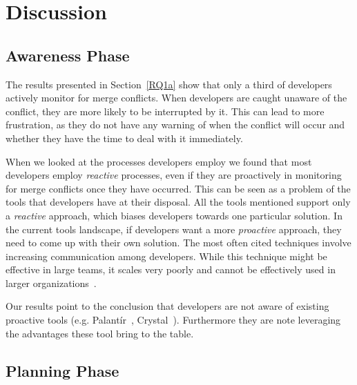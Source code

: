 
\section{Discussion}\label{discussion}

\subsection{Awareness Phase}

The results presented in Section~\ref{RQ1a} show that only a third of developers actively monitor for merge conflicts.
When developers are caught unaware of the conflict, they are more likely to be interrupted by it.
This can lead to more frustration, as they do not have any warning of when the conflict will occur and whether they have the time to deal with it immediately.

When we looked at the processes developers employ we found that most developers employ \emph{reactive} processes, even if they are proactively in monitoring for merge conflicts once they have occurred.
This can be seen as a problem of the tools that developers have at their disposal.
All the tools mentioned support only a \emph{reactive} approach, which biases developers towards one particular solution.
In the current tools landscape, if developers want a more \emph{proactive} approach, they need to come up with their own solution.
The most often cited techniques involve increasing communication among developers.
While this technique might be effective in large teams, it scales very poorly and cannot be effectively used in larger organizations~\cite{brooks1974mythical}\cite{steiner1972group}.

Our results point to the conclusion that developers are not aware of existing proactive tools (e.g. Palant\'{i}r~\cite{sarma_palantir:_2003}, Crystal~\cite{Brun2011}).
Furthermore they are note leveraging the advantages these tool bring to the table. %

\subsection{Planning Phase}

